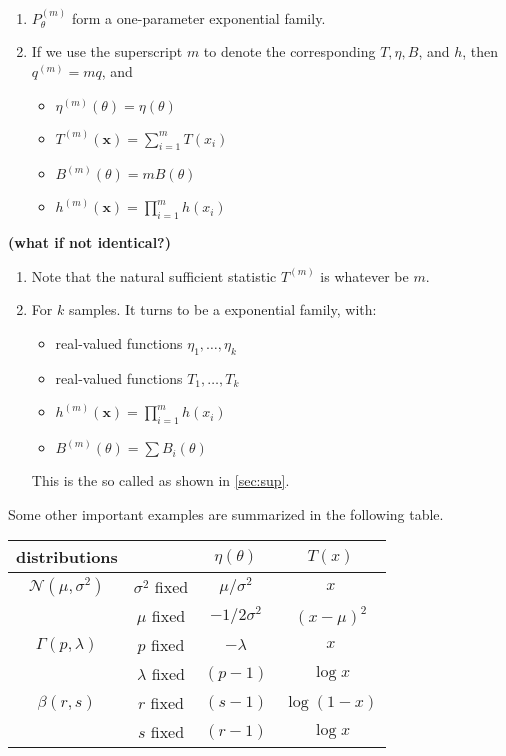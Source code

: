 \documentclass{article}
\newcommand{\bfs}[1]{\textbf{({#1}) }}
\begin{document}
\begin{enumerate}
    \item $P_{\theta}^{(m)}$ form a one-parameter exponential family.
    \item If we use the superscript $m$ to denote the corresponding $T, \eta, B$, and $h$, then $q^{(m)}=m q$, and
    \begin{itemize}
        \item $\eta^{(m)}(\theta) =\eta(\theta)$
        \item $T^{(m)}(\mathbf{x})=\sum_{i=1}^{m} T\left(x_{i}\right)$
        \item $B^{(m)}(\theta)=m B(\theta)$
        \item $h^{(m)}(\mathbf{x})=\prod_{i=1}^{m} h\left(x_{i}\right)$
    \end{itemize}
\end{enumerate}
\begin{rema}\bfs{what if not identical?}\label{re:notiid}
\begin{enumerate}
    \item Note that the natural sufficient statistic $T^{(m)}$ is  whatever be $m.$ 
    \item For  $k$ samples. It turns to be a  exponential family, with:
    \begin{itemize}
        \item real-valued functions $\eta_{1}, \ldots, \eta_{k}$ 
        \item real-valued functions $T_{1}, \ldots, T_{k}$ 
        \item $h^{(m)}(\mathbf{x})=\prod_{i=1}^{m} h\left(x_{i}\right)$
        \item $B^{(m)}(\theta)=\sum B_i(\theta)$
    \end{itemize}
    This is the so called  as shown in \cref{sec:sup}. 
\end{enumerate}
\end{rema}


Some other important examples are summarized in the following table.
\begin{table}[H]
    \centering
\begin{tabular}{cc|c|c} 
distributions & & $\eta(\theta)$ & $T(x)$ \\
\hline $\mathcal{N}\left(\mu, \sigma^{2}\right)$ & $\sigma^{2}$ fixed & $\mu / \sigma^{2}$ & $x$ \\
\cline { 2 - 4 } & $\mu$ fixed & $-1 / 2 \sigma^{2}$ & $(x-\mu)^{2}$ \\
\hline$\Gamma(p, \lambda)$ & $p$ fixed & $-\lambda$ & $x$ \\
\hline & $\lambda$ fixed & $(p-1)$ & $\log x$ \\
\hline$\beta(r, s)$ & $r$ fixed & $(s-1)$ & $\log (1-x)$ \\
\cline { 2 - 4 } & $s$ fixed & $(r-1)$ & $\log x$ \\
\hline
\end{tabular}
\end{table}
\end{document}
